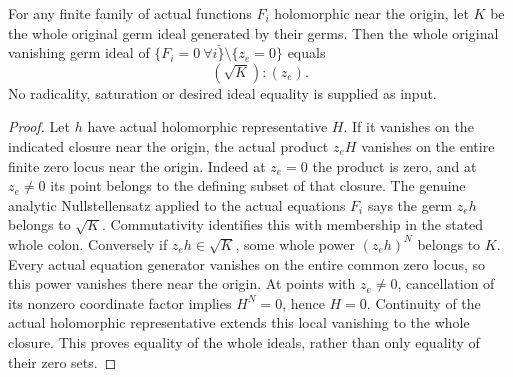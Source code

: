 \begin{theorem}
\label{hir:actual-off-hyperplane-zero-ideal-radical-colon}
\leanok
For any finite family of actual functions $F_i$ holomorphic near the
origin, let $K$ be the whole original germ ideal generated by their germs.
Then the whole original vanishing germ ideal of
$\overline{\{F_i=0\ \forall i\}\setminus\{z_e=0\}}$ equals
\[
 (\sqrt K):(z_e).
\]
No radicality, saturation or desired ideal equality is supplied as input.
\end{theorem}
\begin{proof}
Let $h$ have actual holomorphic representative $H$. If it vanishes on
the indicated closure near the origin, the actual product $z_eH$ vanishes
on the entire finite zero locus near the origin. Indeed at $z_e=0$ the
product is zero, and at $z_e\ne0$ its point belongs to the defining subset
of that closure. The genuine analytic Nullstellensatz applied to the
actual equations $F_i$ says the germ $z_eh$ belongs to $\sqrt K$.
Commutativity identifies this with membership in the stated whole colon.
Conversely if $z_eh\in\sqrt K$, some whole power $(z_eh)^N$ belongs
to $K$. Every actual equation generator vanishes on the entire common
zero locus, so this power vanishes there near the origin. At points with
$z_e\ne0$, cancellation of its nonzero coordinate factor implies
$H^N=0$, hence $H=0$. Continuity of the actual holomorphic representative
extends this local vanishing to the whole closure. This proves equality
of the whole ideals, rather than only equality of their zero sets.
\end{proof}

